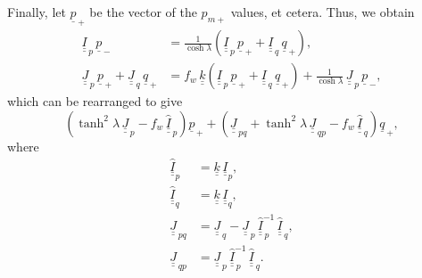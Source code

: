 \documentclass[12pt,prb,aps,notitlepage]{revtex4-1}
\begin{document}
 Finally, let $\underline{p}_{\,+}$ be the vector of the $p_{m+}$ values, et cetera. Thus, we
obtain
\begin{align}
\underline{\underline{I}}_{\,p}\,\underline{p}_{\,-} &= \frac{1}{\cosh\lambda}\left(\underline{\underline{I}}_{\,p}\,\underline{p}_{\,+} + \underline{\underline{I}}_{\,q}\,\underline{q}_{\,+}\right),\\[0.5ex]
\underline{\underline{J}}_{\,p}\,\underline{p}_{\,+}+ \underline{\underline{J}}_{\,q}\,\underline{q}_{\,+} &=
f_w\,\underline{\underline{k}}\left(\underline{\underline{I}}_{\,p}\,\underline{p}_{\,+}+ \underline{\underline{I}}_{\,q}\,\underline{q}_{\,+} \right)
+\frac{1}{\cosh\lambda} \,\underline{\underline{J}}_{\,p}\,\underline{p}_{\,-},
\end{align}
which can be rearranged to give 
\begin{equation}\label{e73}
\left(\tanh^2\lambda\,\underline{\underline{J}}_{\,p}-f_w\,\underline{\underline{\hat{I}}}_{\,p}\right)\underline{p}_{\,+}+
\left(\underline{\underline{J}}_{\,pq}+\tanh^2\lambda\,\underline{\underline{J}}_{\,qp} - f_w\,\underline{\underline{\hat{I}}}_{\,q}\right)\underline{q}_{\,+},
\end{equation}
where
\begin{align}
\underline{\underline{\hat I}}_p &= \underline{\underline{k}}\,\underline{\underline{I}}_p,\\[0.5ex]
\underline{\underline{\hat I}}_q &= \underline{\underline{k}}\,\underline{\underline{I}}_q,\\[0.5ex]
\underline{\underline{J}}_{\,pq} &=\underline{\underline{J}}_{\,q}- \underline{\underline{J}}_{\,p}\,\underline{\underline{\hat{I}}}_{\,p}^{-1}\,\underline{\underline{\hat{I}}}_{\,q},\\[0.5ex]
\underline{\underline{J}}_{\,qp} &= \underline{\underline{J}}_{\,p}\,\underline{\underline{\hat{I}}}_{\,p}^{-1}\,\underline{\underline{\hat{I}}}_{\,q}.
\end{align}
\end{document}
